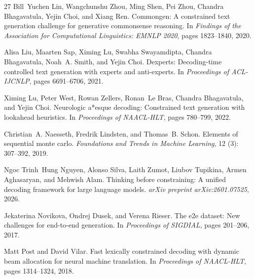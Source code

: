 \documentclass[11pt]{article}
\begin{document}
\begin{thebibliography}{27}
Bill~Yuchen Lin, Wangchunshu Zhou, Ming Shen, Pei Zhou, Chandra Bhagavatula,
  Yejin Choi, and Xiang Ren.
\newblock Commongen: A constrained text generation challenge for generative
  commonsense reasoning.
\newblock In \emph{Findings of the Association for Computational Linguistics:
  EMNLP 2020}, pages 1823--1840, 2020.

Alisa Liu, Maarten Sap, Ximing Lu, Swabha Swayamdipta, Chandra Bhagavatula,
  Noah~A. Smith, and Yejin Choi.
\newblock Dexperts: Decoding-time controlled text generation with experts and
  anti-experts.
\newblock In \emph{Proceedings of ACL-IJCNLP}, pages 6691--6706, 2021.

Ximing Lu, Peter West, Rowan Zellers, Ronan~Le Bras, Chandra Bhagavatula, and
  Yejin Choi.
\newblock Neurologic a*esque decoding: Constrained text generation with
  lookahead heuristics.
\newblock In \emph{Proceedings of NAACL-HLT}, pages 780--799, 2022.

Christian~A. Naesseth, Fredrik Lindsten, and Thomas~B. Schon.
\newblock Elements of sequential monte carlo.
\newblock \emph{Foundations and Trends in Machine Learning}, 12
  (3): 307--392, 2019.

Ngoc Trinh~Hung Nguyen, Alonso Silva, Laith Zumot, Liubov Tupikina, Armen
  Aghasaryan, and Mehwish Alam.
\newblock Thinking before constraining: A unified decoding framework for large
  language models.
\newblock \emph{arXiv preprint arXiv:2601.07525}, 2026.

Jekaterina Novikova, Ondrej Dusek, and Verena Rieser.
\newblock The e2e dataset: New challenges for end-to-end generation.
\newblock In \emph{Proceedings of SIGDIAL}, pages 201--206, 2017.

Matt Post and David Vilar.
\newblock Fast lexically constrained decoding with dynamic beam allocation for
  neural machine translation.
\newblock In \emph{Proceedings of NAACL-HLT}, pages 1314--1324, 2018.


\end{thebibliography}
\end{document}
